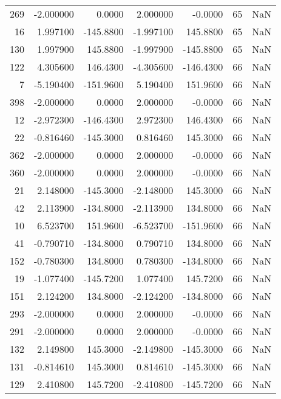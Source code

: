 \begin{tabular}{rrrrrrr}
269 &   -2.000000 &    0.0000 &    2.000000 &     -0.0000 &          65 & NaN \\
 16 &    1.997100 & -145.8800 &   -1.997100 &    145.8800 &          65 & NaN \\
130 &    1.997900 &  145.8800 &   -1.997900 &   -145.8800 &          65 & NaN \\
122 &    4.305600 &  146.4300 &   -4.305600 &   -146.4300 &          66 & NaN \\
  7 &   -5.190400 & -151.9600 &    5.190400 &    151.9600 &          66 & NaN \\
398 &   -2.000000 &    0.0000 &    2.000000 &     -0.0000 &          66 & NaN \\
 12 &   -2.972300 & -146.4300 &    2.972300 &    146.4300 &          66 & NaN \\
 22 &   -0.816460 & -145.3000 &    0.816460 &    145.3000 &          66 & NaN \\
362 &   -2.000000 &    0.0000 &    2.000000 &     -0.0000 &          66 & NaN \\
360 &   -2.000000 &    0.0000 &    2.000000 &     -0.0000 &          66 & NaN \\
 21 &    2.148000 & -145.3000 &   -2.148000 &    145.3000 &          66 & NaN \\
 42 &    2.113900 & -134.8000 &   -2.113900 &    134.8000 &          66 & NaN \\
 10 &    6.523700 &  151.9600 &   -6.523700 &   -151.9600 &          66 & NaN \\
 41 &   -0.790710 & -134.8000 &    0.790710 &    134.8000 &          66 & NaN \\
152 &   -0.780300 &  134.8000 &    0.780300 &   -134.8000 &          66 & NaN \\
 19 &   -1.077400 & -145.7200 &    1.077400 &    145.7200 &          66 & NaN \\
151 &    2.124200 &  134.8000 &   -2.124200 &   -134.8000 &          66 & NaN \\
293 &   -2.000000 &    0.0000 &    2.000000 &     -0.0000 &          66 & NaN \\
291 &   -2.000000 &    0.0000 &    2.000000 &     -0.0000 &          66 & NaN \\
132 &    2.149800 &  145.3000 &   -2.149800 &   -145.3000 &          66 & NaN \\
131 &   -0.814610 &  145.3000 &    0.814610 &   -145.3000 &          66 & NaN \\
129 &    2.410800 &  145.7200 &   -2.410800 &   -145.7200 &          66 & NaN \\

\end{tabular}
